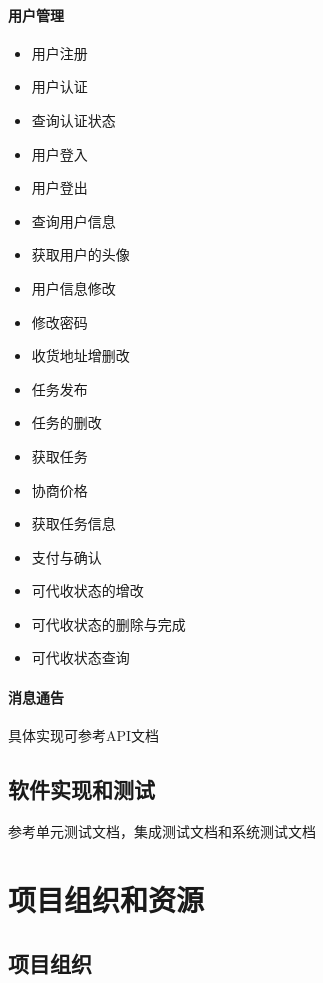 \documentclass[UTF8]{dingo}
\begin{document}
        \paragraph{用户管理}
          \begin{itemize}
             \item 用户注册
             \item 用户认证
             \item 查询认证状态
             \item 用户登入
             \item 用户登出
             \item 查询用户信息
             \item 获取用户的头像
             \item 用户信息修改
             \item 修改密码
             \item 收货地址增删改
          \end{itemize}
        \begin{itemize}
          \item 任务发布
          \item 任务的删改
          \item 获取任务
          \item 协商价格
          \item 获取任务信息
          \item 支付与确认
          \item 可代收状态的增改
          \item 可代收状态的删除与完成
          \item 可代收状态查询
        \end{itemize}
     \paragraph{消息通告}

     具体实现可参考API文档

   \subsection{软件实现和测试}
     参考单元测试文档，集成测试文档和系统测试文档

  \section{项目组织和资源}
    \subsection{项目组织}
\end{document}
